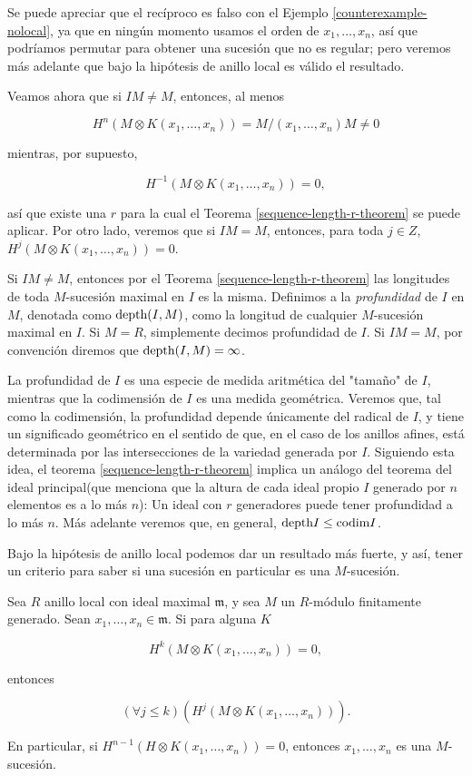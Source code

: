 Se puede apreciar que el recíproco es falso con el Ejemplo \ref{counterexample-nolocal}, ya que en ningún momento usamos el orden de $x_1,\dots, x_n$, así que podríamos permutar para obtener una sucesión que no es regular; pero veremos más adelante que bajo la hipótesis de anillo local es válido el resultado.

Veamos ahora que si $IM \neq M$, entonces, al menos

$$H^n(M\otimes K(x_1,\dots,x_n)) = M/(x_1,\dots,x_n)M \neq 0$$

mientras, por supuesto,

$$ H^{-1}(M\otimes K(x_1,\dots,x_n)) = 0,$$

así que existe una $r$ para la cual el Teorema \ref{sequence-length-r-theorem} se puede aplicar. Por otro lado, veremos que si $IM = M$, entonces, para toda $j \in Z$, $H^j(M\otimes K(x_1,\dots,x_n)) = 0$.

Si $IM \neq M$, entonces por el Teorema \ref{sequence-length-r-theorem} las longitudes de toda $M$-sucesión maximal en $I$ es la misma. Definimos a la \emph{profundidad} de $I$ en $M$, denotada como $\textrm{depth}(I,M)$, como la longitud de cualquier $M$-sucesión maximal en $I$. Si $M = R$, simplemente decimos profundidad de $I$. Si $IM = M$, por convención diremos que $\textrm{depth}(I,M) = \infty$.

La profundidad de $I$ es una especie de medida aritmética del "tamaño" de $I$, mientras que la codimensión de $I$ es una medida geométrica. Veremos que, tal como la codimensión, la profundidad depende únicamente del radical de $I$, y tiene un significado geométrico en el sentido de que, en el caso de los anillos afines, está determinada por las intersecciones de la variedad generada por $I$. Siguiendo esta idea, el teorema \ref{sequence-length-r-theorem} implica un análogo del teorema del ideal principal(que menciona que la altura de cada ideal propio $I$ generado por $n$ elementos es a lo más $n$): Un ideal con $r$ generadores puede tener profundidad a lo más $n$. Más adelante veremos que, en general, $\textrm{depth} I \leq \textrm{codim} I$.

Bajo la hipótesis de anillo local podemos dar un resultado más fuerte, y así, tener un criterio para saber si una sucesión en particular es una $M$-sucesión.

\begin{theorem}\label{sequence-criterion-regular}
Sea $R$ anillo local con ideal maximal $\mathfrak{m}$, y sea $M$ un $R$-módulo finitamente generado. Sean $x_1,\dots,x_n\in\mathfrak{m}$. Si para alguna $K$

$$ H^k(M \otimes K(x_1,\dots,x_n)) = 0, $$

entonces 

$$ (\forall j \leq k)(H^j(M\otimes K(x_1,\dots,x_n))). $$

En particular, si $H^{n-1}(H\otimes K(x_1,\dots,x_n)) = 0$, entonces $x_1,\dots,x_n$ es una $M$-sucesión.
\end{theorem}

